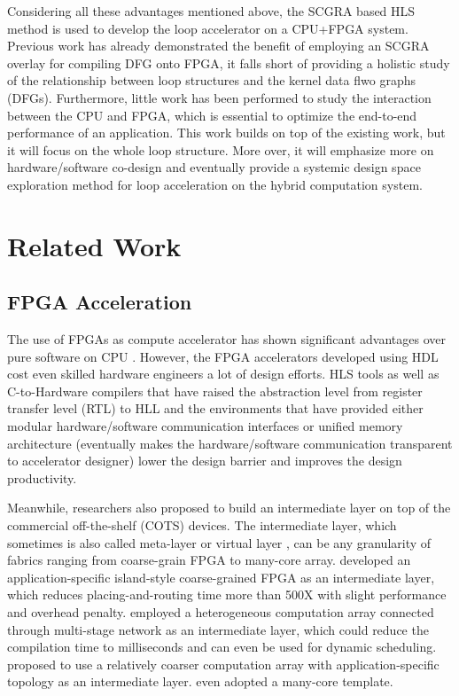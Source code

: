 \documentclass[12pt]{article} %
\begin{document}
Considering all these advantages mentioned above, the SCGRA based HLS method is used to develop the
loop accelerator on a CPU+FPGA system. Previous work \cite{colinheart} has already demonstrated the 
benefit of employing an SCGRA overlay for compiling DFG onto FPGA, it falls short of providing a 
holistic study of the relationship between loop structures and the kernel data flwo graphs (DFGs). 
Furthermore, little work has been performed to study the interaction between the CPU and FPGA, which is 
essential to optimize the end-to-end performance of an application. This work builds on top of the 
existing work, but it will focus on the whole loop structure. More over, it will 
emphasize more on hardware/software co-design and eventually provide a systemic design space
exploration method for loop acceleration on the hybrid computation system.

\section{Related Work}
\subsection{FPGA Acceleration}
The use of FPGAs as compute accelerator has shown significant advantages over pure software on CPU
\cite{app-acc} \cite{random-gen} \cite{EndToEnd}. However, the FPGA accelerators developed using HDL
cost even skilled hardware engineers a lot of design efforts. HLS tools \cite{vivado} \cite{legup}
as well as C-to-Hardware compilers \cite{Handle-c} \cite{Impulse-c} that have raised the abstraction
level from register transfer level (RTL) to HLL and the environments \cite{leap} \cite{coram} that
have provided either modular hardware/software communication interfaces or unified memory
architecture (eventually makes the hardware/software communication transparent to accelerator
designer) lower the design barrier and improves the design productivity.  

Meanwhile, researchers also proposed to build an intermediate layer on top of the commercial off-the-shelf
(COTS) devices. The intermediate layer, which sometimes is also called meta-layer or virtual layer
\cite{EndToEnd} \cite{heterogeneous-cgra}, can be any granularity of fabrics ranging from 
coarse-grain FPGA to many-core array. \cite{vfpga} developed an application-specific island-style
coarse-grained FPGA as an intermediate layer, which reduces placing-and-routing time more than 500X
with slight performance and overhead penalty. \cite{heterogeneous-cgra} employed a heterogeneous
computation array connected through multi-stage network as an intermediate layer, which could reduce
the compilation time to milliseconds and can even be used for dynamic scheduling. \cite{colinheart}
proposed to use a relatively coarser computation array with application-specific topology as an
intermediate layer. \cite{marc} even adopted a many-core template. 
\end{document}
